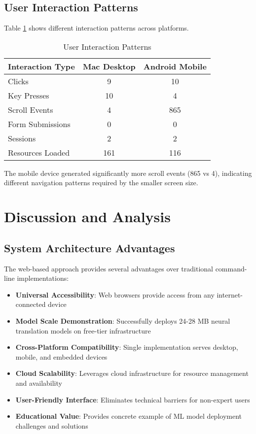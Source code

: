 \documentclass[conference]{IEEEtran}
\begin{document}
\subsection{User Interaction Patterns}

Table \ref{tab:user-interactions} shows different interaction patterns across platforms.

\begin{table}[htbp]
\centering
\caption{User Interaction Patterns}
\label{tab:user-interactions}
\begin{tabular}{@{}lcc@{}}
\toprule
Interaction Type & Mac Desktop & Android Mobile \\
\midrule
Clicks & 9 & 10 \\
Key Presses & 10 & 4 \\
Scroll Events & 4 & 865 \\
Form Submissions & 0 & 0 \\
Sessions & 2 & 2 \\
Resources Loaded & 161 & 116 \\
\bottomrule
\end{tabular}
\end{table}

The mobile device generated significantly more scroll events (865 vs 4), indicating different navigation patterns required by the smaller screen size.

\section{Discussion and Analysis}

\subsection{System Architecture Advantages}

The web-based approach provides several advantages over traditional command-line implementations:

\begin{itemize}
    \item \textbf{Universal Accessibility}: Web browsers provide access from any internet-connected device
    \item \textbf{Model Scale Demonstration}: Successfully deploys 24-28 MB neural translation models on free-tier infrastructure
    \item \textbf{Cross-Platform Compatibility}: Single implementation serves desktop, mobile, and embedded devices
    \item \textbf{Cloud Scalability}: Leverages cloud infrastructure for resource management and availability
    \item \textbf{User-Friendly Interface}: Eliminates technical barriers for non-expert users
    \item \textbf{Educational Value}: Provides concrete example of ML model deployment challenges and solutions
\end{itemize}
\end{document}
